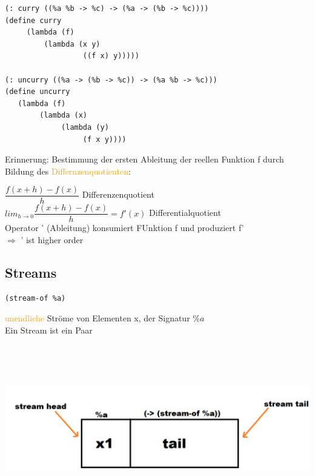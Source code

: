 \documentclass[paper=a4, fontsize=11pt]{scrartcl}
\numberwithin{equation}{section}
\numberwithin{figure}{section}
\numberwithin{table}{section}
\begin{document}
\begin{lstlistig}
\begin{lstlisting}
(: curry ((%a %b -> %c) -> (%a -> (%b -> %c))))
(define curry
     (lambda (f)
         (lambda (x y)
                  ((f x) y)))))
                  
(: uncurry ((%a -> (%b -> %c)) -> (%a %b -> %c)))
(define uncurry
   (lambda (f)
        (lambda (x)
             (lambda (y)
                  (f x y))))                
\end{lstlisting}        

Erinnerung: Bestimmung der ersten Ableitung der reellen Funktion f durch Bildung des \textcolor{orange}{Differnzenquotienten}:


$\dfrac{f(x+h)-f(x)}{h}$ Differenzenquotient \\

$lim_{h \rightarrow 0} \dfrac{f(x+h)-f(x)}{h} = f'(x)$ Differentialquotient \\

Operator ' (Ableitung) konsumiert FUnktion f und produziert f' \\
$\Rightarrow$ ' ist higher order \\
\subsection{Streams}
\begin{lstlisting}
(stream-of %a)
\end{lstlisting}
\textcolor{orange}{unendliche} Ströme von Elementen x, der Signatur $\%a$ \\
Ein Stream ist ein Paar \\

\includegraphics[width=15cm,height=8cm]{streams.png}


\end{lstlistig}
\end{document}
